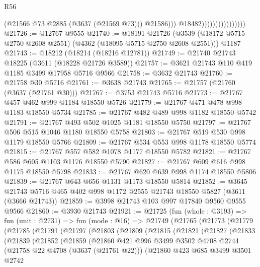 \begin{lexlean}{R56}
\begin{coremodule}
                                          (@21566 @73 @2885 (@3637 (@21569 @73)))
                                          @21586)))
                                    @18482))))))))))))))))
@21726 := @12767 @9555
@21740 := @18191
    @21726
    (@3539 (@18172 @5715 @2750 @2608 @2551) (@4362 (@18095 @5715 @2750 @2608 @2551)))
    @1187
@21743 := @18212 (@18214 (@18216 @12781))
@21749 := @21740 @21743 @18225 (@3611 (@18228 @21726 @3589))
@21757 := @3621 @21743 @110 @419 @1185 @3499 @17958 @5716 @9566
@21758 := @3632 @21743
@21760 := @21758 @30 @5716
@21761 := @3638 @21743
@21765 := @21757 (@21760 (@3637 (@21761 @30)))
@21767 := @3753 @21743 @5716
@21773 := @21767 @457 @462 @999 @1184 @18550 @5726
@21779 := @21767 @471 @478 @998 @1183 @18550 @5734
@21785 := @21767 @482 @489 @998 @1182 @18550 @5742
@21791 := @21767 @493 @502 @1025 @1181 @18550 @5750
@21797 := @21767 @506 @515 @1046 @1180 @18550 @5758
@21803 := @21767 @519 @530 @998 @1179 @18550 @5766
@21809 := @21767 @534 @553 @998 @1178 @18550 @5774
@21815 := @21767 @557 @582 @1078 @1177 @18550 @5782
@21821 := @21767 @586 @605 @1103 @1176 @18550 @5790
@21827 := @21767 @609 @616 @998 @1175 @18550 @5798
@21833 := @21767 @620 @639 @998 @1174 @18550 @5806
@21839 := @21767 @643 @656 @1131 @1173 @18550 @5814
@21852 := @3645 @21743 @5716 @465 @402 @998 @1172 @2555 @21743 @18550 @5827 (@3611 (@3666 @21743))
@21859 := @3998 @21743 @103 @997 @17840 @9560 @9555 @9566
@21860 := @3930 @21743
@21921 := @21725
    (fun (whole : @3193) =>
    fun (unit : @2731) =>
    fun (mode : @16) =>
    @21749
      (@21765
        (@21773
          (@21779
            (@21785
              (@21791
                (@21797
                  (@21803
                    (@21809
                      (@21815
                        (@21821
                          (@21827
                            (@21833
                              (@21839
                                (@21852
                                  (@21859
                                    (@21860
                                      @421
                                      @996
                                      @3499
                                      @3502
                                      @4708
                                      @2744
                                      (@21758 @22 @4708 (@3637 (@21761 @22)))
                                      (@21860
                                        @423
                                        @685
                                        @3499
                                        @3501
                                        @2742

\end{coremodule}
\end{lexlean}
